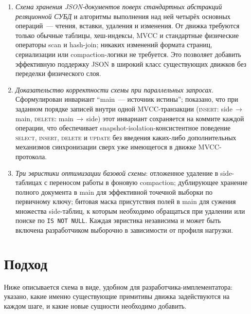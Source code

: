 \documentclass[conference,a4paper,10pt]{IEEEtran}
\begin{document}
\begin{enumerate}
  \item \emph{Схема хранения JSON-документов поверх стандартных
        абстракций реляционной СУБД} и алгоритмы выполнения над ней
        четырёх основных операций~--- чтения, вставки, удаления и
        изменения. От движка требуются только обычные таблицы,
        хеш-индексы, MVCC и стандартные физические операторы scan и
        hash-join; никаких изменений формата страниц, сериализации
        или compaction-логики не требуется. Это позволяет добавить
        эффективную поддержку JSON в широкий класс существующих
        движков без переделки физического слоя.

  \item \emph{Доказательство корректности схемы при параллельных
        запросах}. Сформулирован инвариант ``main~--- источник
        истины''; показано, что при заданном порядке записей внутри
        одной MVCC-транзакции (\textsc{insert}: side\,$\to$\,main,
        \textsc{delete}: main\,$\to$\,side) этот инвариант
        сохраняется на коммите каждой операции, что обеспечивает
        snapshot-isolation-консистентное поведение \textsc{select},
        \textsc{insert}, \textsc{delete} и \textsc{update} без
        введения каких-либо дополнительных механизмов синхронизации
        сверх уже имеющегося в движке MVCC-протокола.

  \item \emph{Три эвристики оптимизации базовой схемы}: отложенное
        удаление в side-таблицах с переносом работы в фоновую
        compaction; дублирующее хранение полного документа в main
        для эффективной точечной выборки по первичному ключу;
        битовая маска присутствия полей в main для сужения
        множества side-таблиц, к которым необходимо обращаться при
        удалении или поиске по \texttt{IS NOT NULL}. Каждая
        эвристика независима и может быть включена разработчиком
        выборочно в зависимости от профиля нагрузки.
\end{enumerate}

\section{Подход}
\label{sec:approach}

Ниже описывается схема в виде, удобном для разработчика-имплементатора:
указано, какие именно существующие примитивы движка задействуются на
каждом шаге, и какие новые сущности необходимо добавить.
\end{document}
